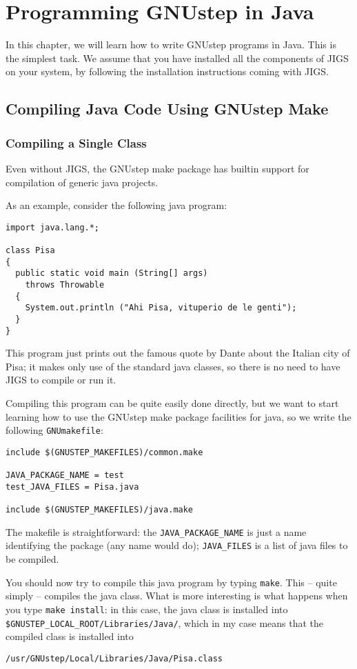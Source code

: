 \chapter{Programming GNUstep in Java}

In this chapter, we will learn how to write GNUstep programs in Java.
This is the simplest task.  We assume that you have installed all the
components of JIGS on your system, by following the installation
instructions coming with JIGS.

\section{Compiling Java Code Using GNUstep Make}

\subsection{Compiling a Single Class}

Even without JIGS, the GNUstep make package has builtin support for
compilation of generic java projects.

As an example, consider the following java program: 
\begin{verbatim}
import java.lang.*;

class Pisa
{ 
  public static void main (String[] args) 
    throws Throwable
  {
    System.out.println ("Ahi Pisa, vituperio de le genti");
  }
}
\end{verbatim}
This program just prints out the famous quote by Dante about the
Italian city of Pisa; it makes only use of the standard java classes,
so there is no need to have JIGS to compile or run it.

Compiling this program can be quite easily done directly, but we want 
to start learning how to use the GNUstep make package facilities for 
java, so we write the following \texttt{GNUmakefile}:
\begin{verbatim}
include $(GNUSTEP_MAKEFILES)/common.make

JAVA_PACKAGE_NAME = test
test_JAVA_FILES = Pisa.java

include $(GNUSTEP_MAKEFILES)/java.make
\end{verbatim}

The makefile is straightforward: the \texttt{JAVA\_PACKAGE\_NAME} is
just a name identifying the package (any name would do);
\texttt{JAVA\_FILES} is a list of java files to be compiled.

You should now try to compile this java program by typing
\texttt{make}.  This -- quite simply -- compiles the java class.
What is more interesting is what happens when you type \texttt{make
install}: in this case, the java class is installed into
\texttt{\$GNUSTEP\_LOCAL\_ROOT/Libraries/Java/}, which in my case means 
that the compiled class is installed into
\begin{verbatim}
/usr/GNUstep/Local/Libraries/Java/Pisa.class
\end{verbatim}


